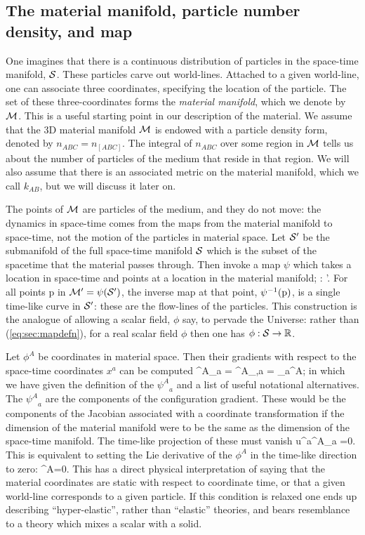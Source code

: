 \subsection{The material manifold,  particle number density, and map}
\label{sec:mpnd}
One imagines that there is a continuous distribution of particles in the space-time manifold, $\mathcal{S}$. These particles carve out world-lines. Attached to a given world-line, one can associate three coordinates, specifying the location of the particle. The set of these three-coordinates forms the \textit{material manifold}, which we denote by $\mathcal{M}$. This is a useful starting point in our description of the material. We  assume that the 3D material manifold $\mathcal{M}$   is endowed with a particle density form, denoted by $n_{ABC} = n_{[ABC]}$.  The integral of $n_{ABC}$ over some region in $\mathcal{M}$ tells us about the number of particles of the medium that reside in that region. We will also assume that there is an associated metric on the material manifold, which we call $k_{AB}$, but we will discuss it   later on. 

The points of $\mathcal{M}$ are  particles of the medium, and they do not move: the dynamics in space-time comes from the maps from the material manifold to space-time, not the motion of the particles in material space.  Let  $\mathcal{S}'$ be the submanifold of the full space-time manifold $\mathcal{S}$  which is the subset of the spacetime that the material passes through. Then invoke a map $\psi$ which takes a location in space-time and points at a location in the material manifold;
\bea
\label{eq:sec:mapdefn}
\psi : \stmanif'\longrightarrow \matmanif.
\eea
For all points p in $\mathcal{M}' = \psi(\mathcal{S}')$, the inverse map at that point, $\psi^{-1}({\rm p})$, is a single time-like curve in $\mathcal{S}'$: these are the flow-lines of the particles. This construction is the analogue of allowing a scalar field, $\phi$ say, to pervade the Universe: rather than (\ref{eq:sec:mapdefn}), for a real scalar field $\phi$ then one has $\phi : \mathcal{S}\rightarrow \mathbb{R}$.

Let $\phi^A$ be   coordinates in material space. Then their gradients with respect to the space-time coordinates $x^a$ can be computed
\bea
\label{eq:sec:config_gradient}
{\psi^A}_a  {} = {\phi^A}_{,a} = \partial_a\phi^A;
\eea
in which we have given the definition of the ${\psi^A}_a$ and a list of useful notational alternatives.
The ${\psi^A}_a$ are   the components of the configuration gradient. These would be the components of the Jacobian associated with a coordinate transformation if the dimension of the material manifold were to be the same as the dimension of the space-time manifold. The time-like projection of these must vanish
\bea
\label{eq:sec:ortho-condition}
u^a{\psi^A}_a =0.
\eea
This is equivalent to setting the Lie derivative of the $\phi^A$ in the time-like direction to zero:
\bea
{}\phi^A=0.
\eea
This has a   direct physical interpretation of saying that the material coordinates are static with respect to coordinate time, or that a given world-line corresponds to a given particle. If this condition is relaxed one ends up describing ``hyper-elastic'', rather than ``elastic'' theories, and bears resemblance to a theory which mixes a scalar with a solid.

